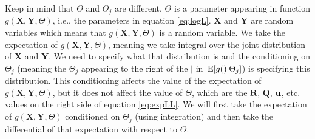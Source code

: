 \documentclass[]{article}
\def\E{\,\textup{\textrm{E}}}
\def\QQ{\mbox{$\mathbf Q$}}	 \def\qq{\mbox{$\mathbf q$}} \def\Qb{\mbox{$\mathbf G$}}  \def\Qm{\mathbb{Q}}
\def\RR{\mbox{$\mathbf R$}}	 \def\rr{\mbox{$\mathbf r$}} \def\Rb{\mbox{$\mathbf H$}}	\def\Rm{\mathbb{R}}
\def\XX{\mbox{$\pmb{X}$}}	\def\xx{\mbox{$\pmb{x}$}}
\def\YY{\mbox{$\pmb{Y}$}}	\def\yy{\mbox{$\pmb{y}$}}
\begin{document}
Keep in mind that $\Theta$ and $\Theta_j$ are different.  $\Theta$ is a parameter appearing in function $g(\XX,\YY,\Theta)$, i.e., the parameters in equation \ref{eq:logL}.  $\XX$ and $\YY$ are random variables which means that $g(\XX,\YY,\Theta)$ is a random variable.  We take the expectation of $g(\XX,\YY,\Theta)$, meaning we take integral over the joint distribution of $\XX$ and $\YY$.  We need to specify what that distribution is and the conditioning on $\Theta_j$ (meaning the $\Theta_j$ appearing to the right of the $|$ in $\E[g()|\Theta_j]$) is specifying this distribution. This conditioning affects the value of the expectation of $g(\XX,\YY,\Theta)$, but it does not affect the value of $\Theta$, which are the $\RR$, $\QQ$, $\mbox{$\mathbf u$}$, etc. values on the right side of equation \ref{eq:expLL}.  We will first take the expectation of $g(\XX,\YY,\Theta)$ conditioned on $\Theta_j$ (using integration) and then take the differential of that expectation with respect to $\Theta$.
\end{document}
